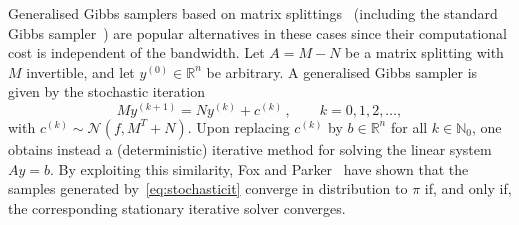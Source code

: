 \documentclass[
fontsize=11pt,
paper=a4,
numbers=noenddot
]{scrartcl}
\begin{document}

Generalised Gibbs samplers based on matrix splittings~\cite{foxparker} (including the standard Gibbs sampler~\cite{gemangeman}) are popular alternatives in these cases since their computational cost is independent of the bandwidth. Let $A = M - N$ be a matrix splitting with $M$ invertible, and let $y^{(0)} \in \mathbb{R}^n$ be arbitrary. A generalised Gibbs sampler is given by the stochastic iteration
\begin{equation}
    \label{eq:stochasticit}
    M y^{(k+1)} = N y^{(k)} + c^{(k)}\,,\qquad k = 0,1,2, \dotsc,
\end{equation}
with $c^{(k)} \sim \mathcal{N}(f, M^T + N)$. Upon replacing $c^{(k)}$ by $b \in \mathbb{R}^n$ for all $k \in \mathbb{N}_0$, one obtains instead a (deterministic) iterative method for solving the linear system $Ay=b$. By exploiting this similarity, Fox and Parker~\cite{foxparker} have shown that the samples generated by~\eqref{eq:stochasticit} converge in distribution to $\pi$ if, and only if, the corresponding stationary iterative solver converges.
\end{document}
